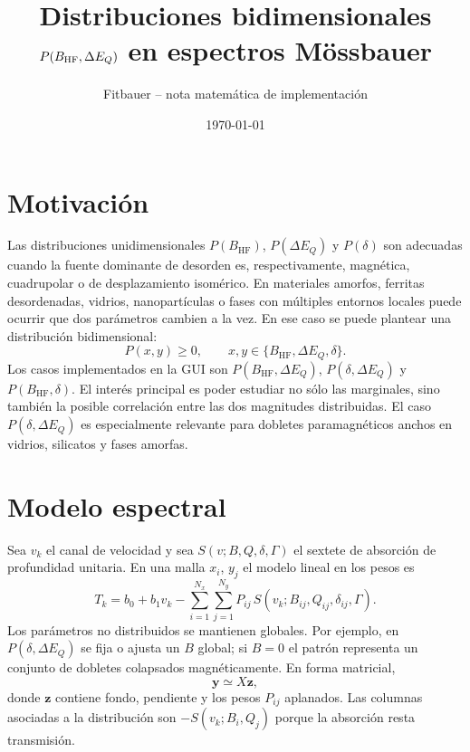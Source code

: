 \documentclass[11pt,a4paper]{article}
\title{Distribuciones bidimensionales $P(\BHF,\DEQ)$ en espectros Mössbauer}
\author{Fitbauer -- nota matemática de implementación}
\date{\today}
\newcommand{\BHF}{B_{\mathrm{HF}}}
\newcommand{\DEQ}{\Delta E_Q}
\begin{document}
\maketitle

\section{Motivación}

Las distribuciones unidimensionales $P(\BHF)$, $P(\DEQ)$ y $P(\delta)$ son
adecuadas cuando la fuente dominante de desorden es, respectivamente, magnética,
cuadrupolar o de desplazamiento isomérico. En materiales amorfos, ferritas
desordenadas, vidrios, nanopartículas o fases con múltiples entornos locales
puede ocurrir que dos parámetros cambien a la vez. En ese caso se puede plantear
una distribución bidimensional:
\begin{equation}
  P(x,y)\ge 0,\qquad x,y\in\{\BHF,\DEQ,\delta\}.
\end{equation}
Los casos implementados en la GUI son $P(\BHF,\DEQ)$, $P(\delta,\DEQ)$ y
$P(\BHF,\delta)$. El interés principal es poder estudiar no sólo las marginales,
sino también la posible correlación entre las dos magnitudes distribuidas. El
caso $P(\delta,\DEQ)$ es especialmente relevante para dobletes paramagnéticos
anchos en vidrios, silicatos y fases amorfas.

\section{Modelo espectral}

Sea $v_k$ el canal de velocidad y sea $S(v;B,Q,\delta,\Gamma)$ el sextete de
absorción de profundidad unitaria. En una malla $x_i$, $y_j$ el modelo lineal en
los pesos es
\begin{equation}
  T_k = b_0 + b_1 v_k - \sum_{i=1}^{N_x}\sum_{j=1}^{N_y}
  P_{ij}\,S(v_k;B_{ij},Q_{ij},\delta_{ij},\Gamma).
\end{equation}
Los parámetros no distribuidos se mantienen globales. Por ejemplo, en
$P(\delta,\DEQ)$ se fija o ajusta un $B$ global; si $B=0$ el patrón representa un
conjunto de dobletes colapsados magnéticamente.
En forma matricial,
\begin{equation}
  \bm y \simeq X\bm z,
\end{equation}
donde $\bm z$ contiene fondo, pendiente y los pesos $P_{ij}$ aplanados. Las
columnas asociadas a la distribución son $-S(v_k;B_i,Q_j)$ porque la absorción
resta transmisión.
\end{document}
